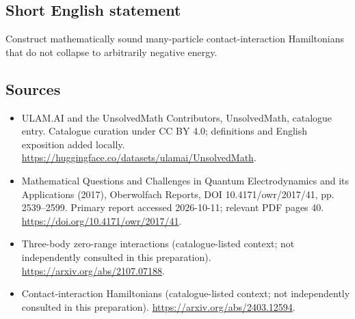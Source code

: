 \documentclass[11pt]{article}
\begin{document}
\subsection{Short English statement}
Construct mathematically sound many-particle contact-interaction Hamiltonians that do not collapse to arbitrarily negative energy.
\subsection{Sources}
\begin{itemize}
\item[\hypertarget{source:statement:1}{S1}] ULAM.AI and the UnsolvedMath Contributors, UnsolvedMath, catalogue entry. Catalogue curation under CC BY 4.0; definitions and English exposition added locally.
\url{https://huggingface.co/datasets/ulamai/UnsolvedMath}.
\item[\hypertarget{source:statement:2}{S2}] Mathematical Questions and Challenges in Quantum Electrodynamics and its Applications (2017), Oberwolfach Reports, DOI 10.4171/owr/2017/41, pp. 2539--2599. Primary report accessed 2026-10-11; relevant PDF pages 40.
\url{https://doi.org/10.4171/owr/2017/41}.
\item[\hypertarget{source:statement:3}{S3}] Three-body zero-range interactions (catalogue-listed context; not independently consulted in this preparation).
\url{https://arxiv.org/abs/2107.07188}.
\item[\hypertarget{source:statement:4}{S4}] Contact-interaction Hamiltonians (catalogue-listed context; not independently consulted in this preparation).
\url{https://arxiv.org/abs/2403.12594}.
\end{itemize}
\label{end:statement}
\end{document}
